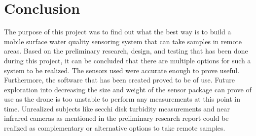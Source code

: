 \newpage
\section{Conclusion}
The purpose of this project was to find out what the best way is to build a mobile surface water quality sensoring system that can take samples in remote areas. Based on the preliminary research, design, and testing that has been done during this project, it can be concluded that there are multiple options for such a system to be realized. The sensors used were accurate enough to prove useful. Furthermore, the software that has been created proved to be of use. Future exploration into decreasing the size and weight of the sensor package can prove of use as the drone is too unstable to perform any measurements at this point in time. Unrealized subjects like secchi disk turbidity measurements and near infrared cameras  as mentioned in the preliminary research report could be realized as complementary or alternative options to take remote samples.

